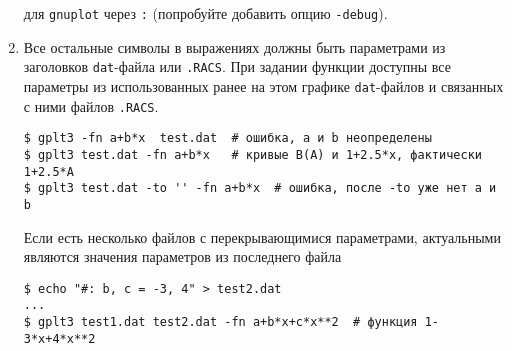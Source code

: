 \documentclass[12pt]{article}
\def\gnuplot{{\tt gnuplot}}
\begin{document}
\begin{enumerate}
  для \gnuplot{} через \verb':' (попробуйте добавить опцию \verb'-debug').
\item Все остальные символы в выражениях должны быть параметрами из заголовков \verb'dat'-файла или \verb'.RACS'. 
При задании функции доступны все параметры из использованных ранее на этом графике \verb'dat'-файлов и связанных с ними файлов \verb'.RACS'.
\begin{verbatim}
$ gplt3 -fn a+b*x  test.dat  # ошибка, a и b неопределены
$ gplt3 test.dat -fn a+b*x   # кривые B(A) и 1+2.5*x, фактически 1+2.5*A
$ gplt3 test.dat -to '' -fn a+b*x  # ошибка, после -to уже нет a и b
\end{verbatim}
Если есть несколько файлов с перекрывающимися параметрами, актуальными являются значения параметров из последнего файла
\begin{verbatim}
$ echo "#: b, c = -3, 4" > test2.dat 
...
$ gplt3 test1.dat test2.dat -fn a+b*x+c*x**2  # функция 1-3*x+4*x**2
\end{verbatim}
\end{enumerate}
\end{document}
